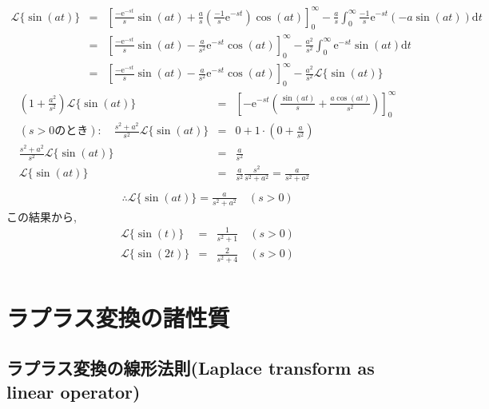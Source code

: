 ﻿\documentclass[a4j]{jarticle}
\begin{document}
\begin{eqnarray*}
\mathcal{L} \{ \sin(at) \} &=& \left[ \frac{-\mathrm{e}^{-st}}{s}\sin(at) + \frac{a}{s} \left( \frac{-1}{s}\mathrm{e}^{-st} \right) \cos(at) \right]_0^\infty - \frac{a}{s}\int_0^\infty{ \frac{-1}{s}\mathrm{e}^{-st} \left( -a \sin(at) \right) \mathrm{d}t } \\
                           &=& \left[ \frac{-\mathrm{e}^{-st}}{s}\sin(at) - \frac{a}{s^2} \mathrm{e}^{-st} \cos (at) \right]_0^\infty - \frac{a^2}{s^2} \int_0^\infty{ \mathrm{e}^{-st}\sin(at)\mathrm{d}t } \\
                           &=& \left[ \frac{-\mathrm{e}^{-st}}{s}\sin(at) - \frac{a}{s^2} \mathrm{e}^{-st} \cos (at) \right]_0^\infty - \frac{a^2}{s^2} \mathcal{L} \{ \sin(at) \}
\end{eqnarray*}
\begin{eqnarray*}
\left( 1 + \frac{a^2}{s^2} \right) \mathcal{L} \{ \sin(at) \}  &=& \left[ -\mathrm{e}^{-st} \left( \frac{\sin(at)}{s} + \frac{a \cos(at)}{s^2} \right) \right]_0^\infty \\
(s>0 \text{のとき}) : \quad \frac{s^2+a^2}{s^2} \mathcal{L} \{ \sin(at) \} &=& 0 + 1 \cdot \left( 0 + \frac{a}{s^2} \right)\\
\frac{s^2+a^2}{s^2} \mathcal{L} \{ \sin(at) \} &=& \frac{a}{s^2} \\
                    \mathcal{L} \{ \sin(at) \} &=& \frac{a}{s^2}\frac{s^2}{s^2+a^2} = \frac{a}{s^2+a^2} \\
\end{eqnarray*}
\begin{eqnarray*}
\therefore \mathcal{L} \{ \sin(at) \} = \frac{a}{s^2+a^2} \quad (s>0)
\end{eqnarray*}
この結果から,
\begin{eqnarray*}
\mathcal{L} \{ \sin(t) \}  &=& \frac{1}{s^2+1} \quad (s>0) \\
\mathcal{L} \{ \sin(2t) \} &=& \frac{2}{s^2+4} \quad (s>0) \\
\end{eqnarray*}

\section{ラプラス変換の諸性質}

\subsection{ラプラス変換の線形法則(Laplace transform as linear operator)}
\end{document}
